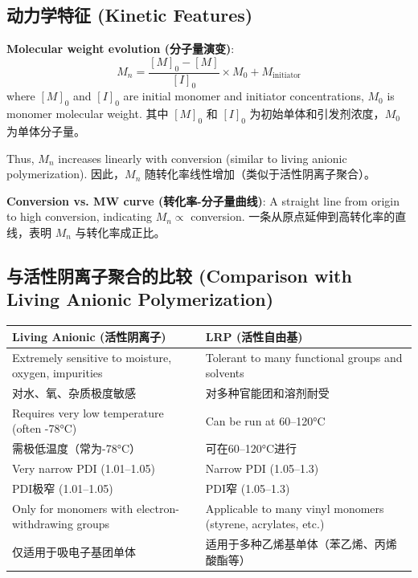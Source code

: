 \documentclass[12pt,a4paper]{ctexart}
\begin{document}
\subsection{动力学特征 (Kinetic Features)}

\textbf{Molecular weight evolution (分子量演变)}:
\[
M_n = \frac{[M]_0 - [M]}{[I]_0} \times M_0 + M_{\text{initiator}}
\]
where $[M]_0$ and $[I]_0$ are initial monomer and initiator concentrations, $M_0$ is monomer molecular weight.  
其中 $[M]_0$ 和 $[I]_0$ 为初始单体和引发剂浓度，$M_0$ 为单体分子量。

Thus, $M_n$ increases linearly with conversion (similar to living anionic polymerization).  
因此，$M_n$ 随转化率线性增加（类似于活性阴离子聚合）。

\textbf{Conversion vs. MW curve (转化率-分子量曲线)}:  
A straight line from origin to high conversion, indicating $M_n \propto$ conversion.  
一条从原点延伸到高转化率的直线，表明 $M_n$ 与转化率成正比。

\subsection{与活性阴离子聚合的比较 (Comparison with Living Anionic Polymerization)}

\begin{longtable}{p{5.5cm}p{5.5cm}}
\toprule
\textbf{Living Anionic (活性阴离子)} & \textbf{LRP (活性自由基)} \\
\midrule
Extremely sensitive to moisture, oxygen, impurities & Tolerant to many functional groups and solvents \\
对水、氧、杂质极度敏感 & 对多种官能团和溶剂耐受 \\
Requires very low temperature (often -78°C) & Can be run at 60–120°C \\
需极低温度（常为-78°C） & 可在60–120°C进行 \\
Very narrow PDI (1.01–1.05) & Narrow PDI (1.05–1.3) \\
PDI极窄 (1.01–1.05) & PDI窄 (1.05–1.3) \\
Only for monomers with electron-withdrawing groups & Applicable to many vinyl monomers (styrene, acrylates, etc.) \\
仅适用于吸电子基团单体 & 适用于多种乙烯基单体（苯乙烯、丙烯酸酯等） \\
\bottomrule
\end{longtable}
\end{document}
